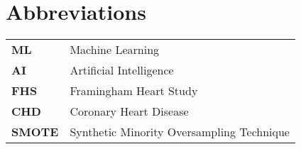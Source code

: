\newpage
{}

\begin{abstract}


\end{abstract}
\newpage

\section*{Abbreviations}

\begin{tabular}{ll}
\textbf{ML}    & Machine Learning \\
\textbf{AI}    & Artificial Intelligence \\
\textbf{FHS}   & Framingham Heart Study \\
\textbf{CHD}   & Coronary Heart Disease \\
\textbf{SMOTE} & Synthetic Minority Oversampling Technique \\
\end{tabular}


\listoffigures 
{}
\listoftables

\newpage

\tableofcontents

\newpage
{}